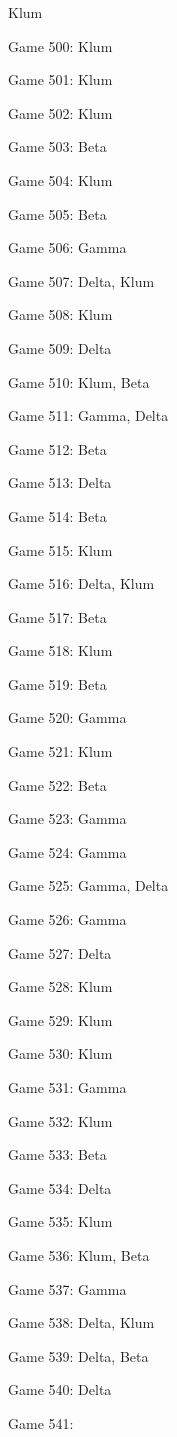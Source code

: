\documentclass{article}
\begin{document}
\begin{multicols}{3}
\begin{compactitem}
Klum
\item Game 500:
Klum
\item Game 501:
Klum
\item Game 502:
Klum
\item Game 503:
Beta
\item Game 504:
Klum
\item Game 505:
Beta
\item Game 506:
Gamma
\item Game 507:
Delta, Klum
\item Game 508:
Klum
\item Game 509:
Delta
\item Game 510:
Klum, Beta
\item Game 511:
Gamma, Delta
\item Game 512:
Beta
\item Game 513:
Delta
\item Game 514:
Beta
\item Game 515:
Klum
\item Game 516:
Delta, Klum
\item Game 517:
Beta
\item Game 518:
Klum
\item Game 519:
Beta
\item Game 520:
Gamma
\item Game 521:
Klum
\item Game 522:
Beta
\item Game 523:
Gamma
\item Game 524:
Gamma
\item Game 525:
Gamma, Delta
\item Game 526:
Gamma
\item Game 527:
Delta
\item Game 528:
Klum
\item Game 529:
Klum
\item Game 530:
Klum
\item Game 531:
Gamma
\item Game 532:
Klum
\item Game 533:
Beta
\item Game 534:
Delta
\item Game 535:
Klum
\item Game 536:
Klum, Beta
\item Game 537:
Gamma
\item Game 538:
Delta, Klum
\item Game 539:
Delta, Beta
\item Game 540:
Delta
\item Game 541:

\end{compactitem}
\end{multicols}
\end{document}
